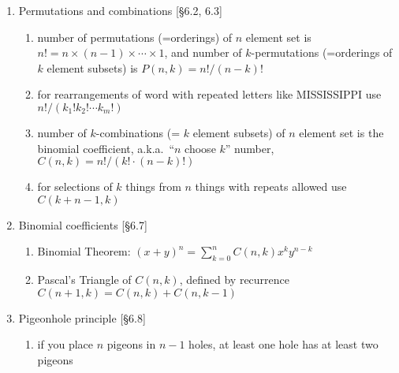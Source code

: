 \documentclass[11pt]{article}
\begin{document}
\begin{enumerate}
\item Permutations and combinations [\S6.2, 6.3]
\begin{enumerate}
\item number of permutations (=orderings) of $n$ element set is $n! = n \times (n-1) \times \cdots \times 1$, and number of $k$-permutations (=orderings of $k$ element subsets) is $P(n,k) = n!/(n-k)!$
\item for rearrangements of word with repeated letters like MISSISSIPPI use $n! / (k_1! k_2! \cdots k_m !)$
\item number of $k$-combinations (= $k$ element subsets) of $n$ element set is the binomial coefficient, a.k.a.~``$n$ choose $k$'' number, $C(n,k) = n!/( k! \cdot (n-k)! )$
\item for selections of $k$ things from $n$ things with repeats allowed use $C(k+n-1,k)$
\end{enumerate}

\item Binomial coefficients [\S 6.7]
\begin{enumerate}
\item Binomial Theorem: $(x+y)^n = \sum_{k=0}^{n} C(n,k) x^k y^{n-k}$
\item Pascal's Triangle of $C(n,k)$, defined by recurrence $C(n+1,k) = C(n,k) + C(n,k-1)$
\end{enumerate}


\item Pigeonhole principle [\S6.8]
\begin{enumerate}
\item if you place $n$ pigeons in $n-1$ holes, at least one hole has at least two pigeons
\end{enumerate}

\end{enumerate}
\end{document}
